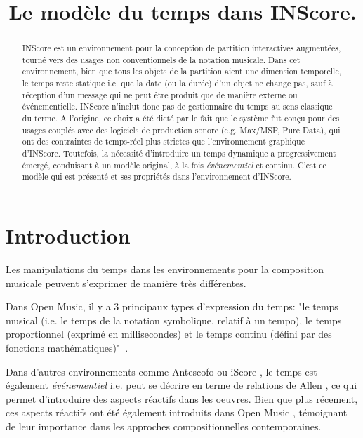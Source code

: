 \documentclass{article}
\title{Le modèle du temps dans INScore.}
\begin{document}
%
\maketitle
%
\begin{abstract}
INScore est un environnement pour la conception de partition interactives augmentées, tourné vers des usages non conventionnels de la notation musicale. Dans cet environnement, bien que tous les objets de la partition aient une dimension temporelle, le temps reste statique i.e. que la date (ou la durée) d'un objet ne change pas, sauf à réception d'un message qui ne peut être produit que de manière externe ou événementielle. INScore n'inclut donc pas de gestionnaire du temps au sens classique du terme. 
A l'origine, ce choix a été dicté par le fait que le système fut conçu pour des usages couplés avec des logiciels de production sonore (e.g. Max/MSP, Pure Data), qui ont des contraintes de temps-réel plus strictes que l'environnement graphique d'INScore.
Toutefois, la nécessité d'introduire un temps dynamique a progressivement émergé, conduisant à un modèle original, à la fois \emph{événementiel} et continu. C'est ce modèle qui est présenté et ses propriétés dans l'environnement d'INScore.
\end{abstract}

\section{Introduction}\label{sec:introduction}

Les manipulations du temps dans les environnements pour la composition musicale peuvent s'exprimer de manière très différentes.

Dans Open Music, il y a 3 principaux types d'expression du temps: "le temps musical (i.e. le temps de la notation symbolique, relatif à un tempo), le temps proportionnel (exprimé en millisecondes) et le temps continu (défini par des fonctions mathématiques)"~\cite{bresson08}. 

Dans d'autres environnements comme Antescofo \cite{acont08} ou iScore \cite{AllombertDA08}, le temps est également \textit{événementiel} i.e. peut se décrire en terme de relations de Allen \cite{Allen:1983:MKT:182.358434}, ce qui permet d'introduire des aspects réactifs dans les oeuvres. 
Bien que plus récement, ces aspects réactifs ont été également introduits dans Open Music \cite{bresson:hal-00965747}, témoignant de leur importance dans les approches compositionnelles contemporaines.
\end{document}
